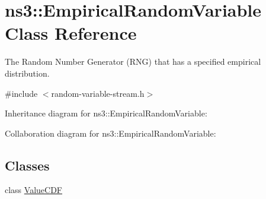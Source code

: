 \hypertarget{classns3_1_1EmpiricalRandomVariable}{}\section{ns3\+:\+:Empirical\+Random\+Variable Class Reference}
\label{classns3_1_1EmpiricalRandomVariable}


The Random Number Generator (R\+NG) that has a specified empirical distribution.  




{\ttfamily \#include $<$random-\/variable-\/stream.\+h$>$}



Inheritance diagram for ns3\+:\+:Empirical\+Random\+Variable\+:


Collaboration diagram for ns3\+:\+:Empirical\+Random\+Variable\+:
\subsection*{Classes}
\begin{DoxyCompactItemize}
\item 
class \hyperlink{classns3_1_1EmpiricalRandomVariable_1_1ValueCDF}{Value\+C\+DF}
\end{DoxyCompactItemize}
